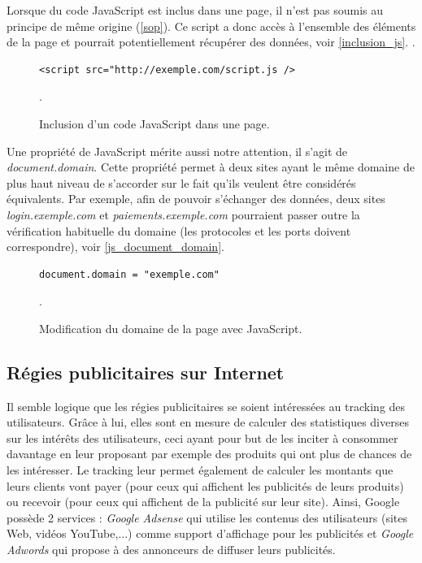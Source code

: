 Lorsque du code JavaScript est inclus dans une page, il n'est pas soumis au principe de même origine (\autoref{sop}). Ce script a donc accès à l'ensemble des éléments de la page et pourrait potentiellement récupérer des données, voir \autoref{inclusion_js}. \cite{sullivan2011web}.
\begin{figure}[h]
	\centering
	\begin{lstlisting}
<script src="http://exemple.com/script.js />
	\end{lstlisting}
	\caption{\label{inclusion_js}Inclusion d'un code JavaScript dans une page.}.
\end{figure}

Une propriété de JavaScript mérite aussi notre attention, il s'agit de \textit{document.domain}. Cette propriété permet à deux sites ayant le même domaine de plus haut niveau de s'accorder sur le fait qu'ils veulent être considérés équivalents. Par exemple, afin de pouvoir s'échanger des données, deux sites \textit{login.exemple.com} et \textit{paiements.exemple.com} pourraient passer outre la vérification habituelle du domaine (les protocoles et les ports doivent correspondre), voir \autoref{js_document_domain}.
\begin{figure}[h]
	\centering
	\begin{lstlisting}
document.domain = "exemple.com"
	\end{lstlisting}
	\caption{\label{js_document_domain}Modification du domaine de la page avec JavaScript.}.
\end{figure}

\subsection{Régies publicitaires sur Internet}
Il semble logique que les régies publicitaires se soient intéressées au tracking des utilisateurs. Grâce à lui, elles sont en mesure de calculer des statistiques diverses sur les intérêts des utilisateurs, ceci ayant pour but de les inciter à consommer davantage en leur proposant par exemple des produits qui ont plus de chances de les intéresser. Le tracking leur permet également de calculer les montants que leurs clients vont payer (pour ceux qui affichent les publicités de leurs produits) ou recevoir (pour ceux qui affichent de la publicité sur leur site). Ainsi, Google possède 2 services : \textit{Google Adsense} qui utilise les contenus des utilisateurs (sites Web, vidéos YouTube,...) comme support d'affichage pour les publicités et \textit{Google Adwords} qui propose à des annonceurs de diffuser leurs publicités.
\newline

